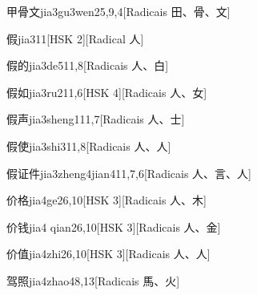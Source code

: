 \begin{entry}{甲骨文}{jia3gu3wen2}{5,9,4}[Radicais ⽥、⾻、⽂]
\end{entry}

\begin{entry}{假}{jia3}{11}[HSK 2][Radical ⼈]
\end{entry}

\begin{entry}{假的}{jia3de5}{11,8}[Radicais ⼈、⽩]
\end{entry}

\begin{entry}{假如}{jia3ru2}{11,6}[HSK 4][Radicais ⼈、⼥]
\end{entry}

\begin{entry}{假声}{jia3sheng1}{11,7}[Radicais ⼈、⼠]
\end{entry}

\begin{entry}{假使}{jia3shi3}{11,8}[Radicais ⼈、⼈]
\end{entry}

\begin{entry}{假证件}{jia3zheng4jian4}{11,7,6}[Radicais ⼈、⾔、⼈]
\end{entry}

\begin{entry}{价格}{jia4ge2}{6,10}[HSK 3][Radicais ⼈、⽊]
\end{entry}

\begin{entry}{价钱}{jia4 qian2}{6,10}[HSK 3][Radicais ⼈、⾦]
\end{entry}

\begin{entry}{价值}{jia4zhi2}{6,10}[HSK 3][Radicais ⼈、⼈]
\end{entry}

\begin{entry}{驾照}{jia4zhao4}{8,13}[Radicais ⾺、⽕]
\end{entry}

